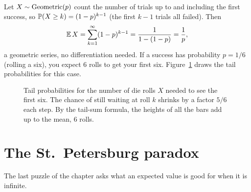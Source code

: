 \begin{example}
\label{ch08:ex-geom}
Let $X \sim \Geom(p)$ count the number of trials up to and including the first
success, so $\P(X \ge k) = (1-p)^{k-1}$ (the first $k-1$ trials all failed). Then
\[
  \E X = \sum_{k=1}^\infty (1-p)^{k-1} = \frac{1}{1-(1-p)} = \frac1p,
\]
a geometric series, no differentiation needed. If a success has probability
$p = 1/6$ (rolling a six), you expect $6$ rolls to get your first six.
Figure~\ref{ch08:fig-geom-tail} draws the tail probabilities for this case.
\end{example}

\begin{figure}[H]
\centering
{}
\caption{Tail probabilities for the number of die rolls $X$ needed to see the
first six. The chance of still waiting at roll $k$ shrinks by a factor $5/6$
each step. By the tail-sum formula, the heights of all the bars add up to the
mean, $6$ rolls.}
\label{ch08:fig-geom-tail}
\end{figure}

\section{The St.\ Petersburg paradox}
\label{ch08:st-petersburg}

The last puzzle of the chapter asks what an expected value is good for when it
is infinite.

